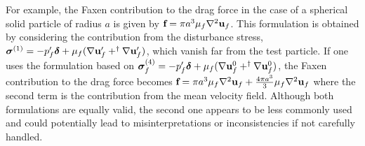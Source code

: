 For example, the Faxen contribution to the drag force in the case of a spherical solid particle of radius $a$ is given by $\textbf{f} = \pi a^3 \mu_f \mathbf{\nabla}^2 \textbf{u}_f$. 
This formulation is obtained  by considering the contribution from the disturbance stress, $\bm\sigma ^{(1)}  = -p_f' \bm\delta + \mu_f (\mathbf{\nabla} \textbf{u}_f' + ^\dagger \mathbf{\nabla} \textbf{u}_f')$, which vanish far from the test particle. 
If one uses the formulation based on $\bm\sigma_f^{(4)}  = -p_f' \bm\delta + \mu_f (\mathbf{\nabla} \textbf{u}_f^0 + ^\dagger \mathbf{\nabla} \textbf{u}_f^0)$, the Faxen contribution to the drag force becomes $\textbf{f} = \pi a^3 \mu_f \mathbf{\nabla}^2 \textbf{u}_f + \frac{4\pi a^3}{3}\mu_f \mathbf{\nabla}^2 \textbf{u}_f$ where the second term is the contribution from the mean velocity field.
Although both formulations are equally valid, the second one appears to be less commonly used and could potentially lead to misinterpretations or inconsistencies if not carefully handled. 




